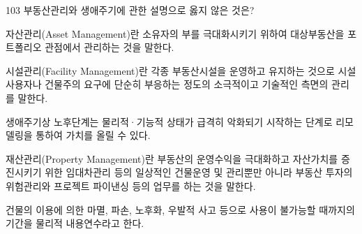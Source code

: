 \begin{question}{103}
부동산관리와 생애주기에 관한 설명으로 옳지 않은 것은?
\begin{choices}
  \item 자산관리(Asset Management)란 소유자의 부를 극대화시키기 위하여 대상부동산을 포트폴리오 관점에서 관리하는 것을 말한다.
  \item 시설관리(Facility Management)란 각종 부동산시설을 운영하고 유지하는 것으로 시설 사용자나 건물주의 요구에 단순히 부응하는 정도의 소극적이고 기술적인 측면의 관리를 말한다.
  \item 생애주기상 노후단계는 물리적·기능적 상태가 급격히 악화되기 시작하는 단계로 리모델링을 통하여 가치를 올릴 수 있다.
  \item 재산관리(Property Management)란 부동산의 운영수익을 극대화하고 자산가치를 증진시키기 위한 임대차관리 등의 일상적인 건물운영 및 관리뿐만 아니라 부동산 투자의 위험관리와 프로젝트 파이낸싱 등의 업무를 하는 것을 말한다.
  \item 건물의 이용에 의한 마멸, 파손, 노후화, 우발적 사고 등으로 사용이 불가능할 때까지의 기간을 물리적 내용연수라고 한다.
\end{choices}
\end{question}
